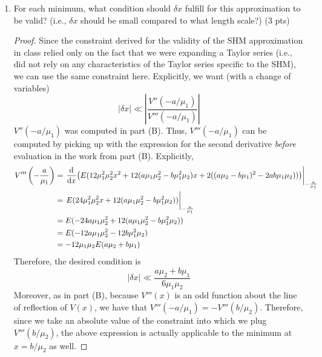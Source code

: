 \documentclass[../psets.tex]{subfiles}
\begin{document}
\begin{enumerate}
\begin{enumerate}
\begin{proof}
            In fact, because $V''(x)$ is a parabola with the same bilateral symmetry as $V(x)$, we have that $V''(-a/\mu_1)=V''(b/\mu_2)$. Therefore, the above expression is actually applicable the minimum at $x=b/\mu_2$ as well.
        \end{proof}
        \item For each minimum, what condition should $\delta x$ fulfill for this approximation to be valid? (i.e., $\delta x$ should be small compared to what length scale?) (3 pts)
        \begin{proof}
            Since the constraint derived for the validity of the SHM approximation in class relied only on the fact that we were expanding a Taylor series (i.e., did not rely on any characteristics of the Taylor series specific to the SHM), we can use the same constraint here. Explicitly, we want (with a change of variables)
            \begin{equation*}
                |\delta x| \ll \left| \frac{V''(-a/\mu_1)}{V'''(-a/\mu_1)} \right|
            \end{equation*}
            $V''(-a/\mu_1)$ was computed in part (B). Thus, $V'''(-a/\mu_1)$ can be computed by picking up with the expression for the second derivative \emph{before} evaluation in the work from part (B). Explicitly,
            \begin{align*}
                V'''\left( -\frac{a}{\mu_1} \right) &= \eval{\dv{x}(E(12\mu_1^2\mu_2^2x^2+12(a\mu_1\mu_2^2-b\mu_1^2\mu_2)x+2((a\mu_2-b\mu_1)^2-2ab\mu_1\mu_2)))}_{-\frac{a}{\mu_1}}\\
                &= \eval{E(24\mu_1^2\mu_2^2x+12(a\mu_1\mu_2^2-b\mu_1^2\mu_2))}_{-\frac{a}{\mu_1}}\\
                &= E(-24a\mu_1\mu_2^2+12(a\mu_1\mu_2^2-b\mu_1^2\mu_2))\\
                &= E(-12a\mu_1\mu_2^2-12b\mu_1^2\mu_2)\\
                &= -12\mu_1\mu_2E(a\mu_2+b\mu_1)
            \end{align*}
            Therefore, the desired condition is
            \begin{equation*}
                \boxed{|\delta x| \ll \frac{a\mu_2+b\mu_1}{6\mu_1\mu_2}}
            \end{equation*}
            Moreover, as in part (B), because $V'''(x)$ is an odd function about the line of reflection of $V(x)$, we have that $V'''(-a/\mu_1)=-V'''(b/\mu_2)$. Therefore, since we take an absolute value of the constraint into which we plug $V'''(b/\mu_2)$, the above expression is actually applicable to the minimum at $x=b/\mu_2$ as well.

\end{proof}
\end{enumerate}
\end{enumerate}
\end{document}
